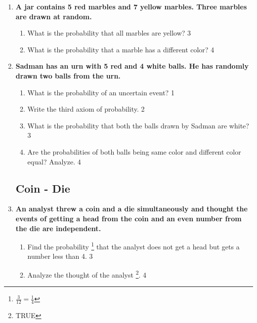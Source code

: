 \documentclass[a4paper,oneside, margin=1.4in]{book}
\begin{document}
\begin{enumerate}
  \begin{enumerate}
    \item
	What is the value of $^nC_r$? \hfill 1
    \item
	Illustrate the difference between permutation and combination with an example. \hfill 2
    \item  
	What is the probability that all balls are green? \hfill 3
    \item
	What is the probabilith that one ball has a different color? \hfill 4
  \end{enumerate}
  
  \item
	  \textbf{A jar contains 5 red marbles and 7 yellow marbles. 
	  Three marbles are drawn at random.} 
  
  \begin{enumerate}
    \item  
	What is the probability that all marbles are yellow? \hfill 3
    \item
	What is the probability that a marble has a different color? \hfill 4
  \end{enumerate}


\item
	  \textbf{Sadman has an urn with 5 red and 4 white balls. He has randomly drawn two balls from the urn.} 
  
  \begin{enumerate}
    \item
	What is the probability of an uncertain event? \hfill 1
    \item
	Write the third axiom of probability. \hfill 2
    \item  
	What is the probability that both the balls drawn by Sadman are white? \hfill 3
    \item
	Are the probabilities of both balls being same color and different color equal? Analyze. \hfill 4
  \end{enumerate}
  
  \subsection{Coin - Die}
  
   \item
	  \textbf{An analyst threw a coin and a die simultaneously and thought the events of getting a head from the coin and an even number from the die are independent.} 
  
  \begin{enumerate}
    \item  
	Find the probability \footnote{$\frac{3}{12} = \frac14$} that the analyst does not get a head but gets a number less than 4. \hfill 3
    \item
	Analyze the thought of the analyst \footnote{TRUE}. \hfill 4
  \end{enumerate}


\end{enumerate}
\end{document}

